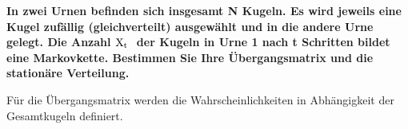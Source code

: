 {
\newcommand\textstyleAbsatzStandardschriftart[1]{#1}
\newcommand\normalsubformula[1]{\text{\mathversion{normal}$#1$}}

\begin{uebsp}
\begin{Exercise}

{\bfseries
In zwei Urnen befinden sich insgesamt N Kugeln. Es wird jeweils eine
Kugel zuf\"allig (gleichverteilt) ausgew\"ahlt und in die andere Urne
gelegt. Die Anzahl 
$\normalsubformula{\text{X}}_{\normalsubformula{\text{t}}}\normalsubformula{\text{~}}$
\textstyleAbsatzStandardschriftart{der Kugeln in Urne 1 nach t
Schritten bildet eine Markovkette. Bestimmen Sie Ihre \"Ubergangsmatrix
und die station\"are Verteilung.}}

\end{Exercise}
\begin{Answer}










{
F\"ur die \"Ubergangsmatrix werden die Wahrscheinlichkeiten in
Abh\"angigkeit der Gesamtkugeln definiert.}


\end{Answer}
\end{uebsp}}
